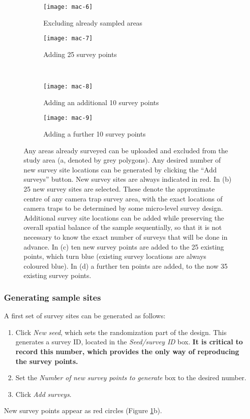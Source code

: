 \documentclass[a4paper,11pt, draft]{article} %
\begin{document}
\begin{figure}[htbp]
\centering
  \begin{subfigure}[b]{0.49\textwidth}
    \texttt{[image: mac-6]}
    \caption{Excluding already sampled areas}
  \end{subfigure}
  \begin{subfigure}[b]{0.49\textwidth}
    \texttt{[image: mac-7]}
    \caption{Adding 25 survey points}
  \end{subfigure} \\
    \begin{subfigure}[b]{0.49\textwidth}
    \texttt{[image: mac-8]}
    \caption{Adding an additional 10 survey points}
  \end{subfigure}
  \begin{subfigure}[b]{0.49\textwidth}
    \texttt{[image: mac-9]}
    \caption{Adding a further 10 survey points}
  \end{subfigure}
  \caption{Any areas already surveyed can be uploaded and excluded from the study area (a, denoted by grey polygons). Any desired number of new survey site locations can be generated by clicking the ``Add surveys'' button. New survey sites are always indicated in red. In (b) 25 new survey sites are selected. These denote the approximate centre of any camera trap survey area, with the exact locations of camera traps to be determined by some micro-level survey design. Additional survey site locations can be added while preserving the overall spatial balance of the sample sequentially, so that it is not necessary to know the exact number of surveys that will be done in advance. In (c) ten new survey points are added to the 25 existing points, which turn blue (existing survey locations are always coloured blue). In (d) a further ten points are added, to the now 35 existing survey points.}
\label{mac-6789}
\end{figure}
 

\subsubsection{Generating sample sites}
A first set of survey sites can be generated as follows:
\begin{enumerate}
\item Click \textit{New seed}, which sets the randomization part of the design. This generates a survey ID, located in the \textit{Seed/survey ID} box. {\bf It is critical to record this number, which provides the only way of reproducing the survey points.}
\item Set the \textit{Number of new survey points to generate} box to the desired number.
\item Click \textit{Add surveys}. 
\end{enumerate}
New survey points appear as red circles (Figure \ref{mac-6789}b).
\end{document}
